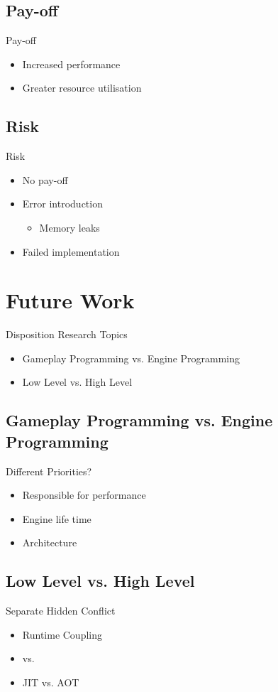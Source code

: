\subsection{Pay-off}
\begin{frame}{\secname}{\subsecname}
	Pay-off
	\begin{itemize}
		\item<2-> Increased performance
		\item<3-> Greater resource utilisation
	\end{itemize}
\end{frame}

\subsection{Risk}
\begin{frame}{\secname}{\subsecname}
	Risk
	\begin{itemize}
		\item<2-> No pay-off
		\item<3-> Error introduction
		\begin{itemize}
			\item<4-> Memory leaks
		\end{itemize}
		\item<5-> Failed implementation
	\end{itemize}
\end{frame}

\section{Future Work}
\begin{frame}{\secname}{Disposition}
	Research Topics
	\begin{itemize}
		\item Gameplay Programming vs. Engine Programming
		\item Low Level vs. High Level
	\end{itemize}
\end{frame}

\subsection{Gameplay Programming vs. Engine Programming}
\begin{frame}{\secname}{\subsecname}
	Different Priorities?
	\begin{itemize}
		\item<2-> Responsible for performance
		\item<3-> Engine life time
		\item<4-> Architecture
	\end{itemize}
\end{frame}

\subsection{Low Level vs. High Level}
\begin{frame}{\secname}{\subsecname}
	Separate Hidden Conflict
	\begin{itemize}
		\item<2-> Runtime Coupling
		\item<3-> \cpp vs. \cs
		\item<4-> JIT vs. AOT
	\end{itemize}
\end{frame}
